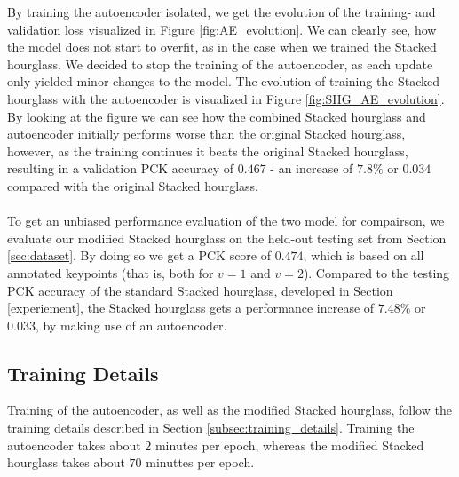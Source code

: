 \documentclass[./main.tex]{subfiles}
\begin{document}
\noindent By training the autoencoder isolated, we get the evolution of the training- and validation loss visualized in Figure \ref{fig:AE_evolution}. We can clearly see, how the model does not start to overfit, as in the case when we trained the Stacked hourglass. We decided to stop the training of the autoencoder, as each update only yielded minor changes to the model. The evolution of training the Stacked hourglass with the autoencoder is visualized in Figure \ref{fig:SHG_AE_evolution}. By looking at the figure we can see how the combined Stacked hourglass and autoencoder initially performs worse than the original Stacked hourglass, however, as the training continues it beats the original Stacked hourglass, resulting in a validation PCK accuracy of $0.467$ - an increase of $7.8\%$ or $0.034$ compared with the original Stacked hourglass.
\\
\\
To get an unbiased performance evaluation of the two model for compairson, we evaluate our modified Stacked hourglass on the held-out testing set from Section \ref{sec:dataset}. By doing so we get a PCK score of $0.474$, which is based on all annotated keypoints (that is, both for $v = 1$ and $v = 2$). Compared to the testing PCK accuracy of the standard Stacked hourglass, developed in Section \ref{experiement}, the Stacked hourglass gets a performance increase of $7.48\%$ or $0.033$, by making use of an autoencoder.

\subsection{Training Details}\label{subsec:improv_train}
Training of the autoencoder, as well as the modified Stacked hourglass, follow the training details described in Section \ref{subsec:training_details}. Training the autoencoder takes about $2$ minutes per epoch, whereas the modified Stacked hourglass takes about $70$ minuttes per epoch.
\end{document}
